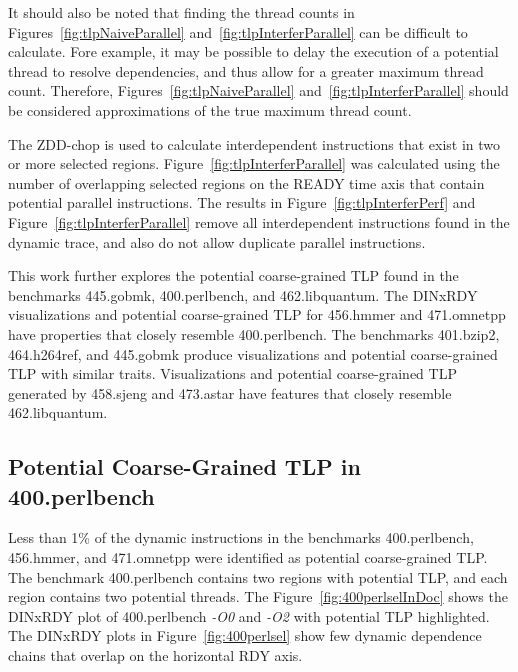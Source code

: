 {It should also be noted that finding the thread counts in Figures~\ref{fig:tlpNaiveParallel} and~\ref{fig:tlpInterferParallel} can be difficult to calculate.  Fore example, it may be possible to delay the execution of a potential thread to resolve dependencies, and thus allow for a greater maximum thread count.  Therefore, Figures~\ref{fig:tlpNaiveParallel} and~\ref{fig:tlpInterferParallel} should be considered approximations of the true maximum thread count.

The ZDD-chop is used to calculate interdependent instructions that exist in two or more selected regions. Figure~\ref{fig:tlpInterferParallel} was calculated using the number of overlapping selected regions on the READY time axis that contain potential parallel instructions. The results in Figure~\ref{fig:tlpInterferPerf} and Figure~\ref{fig:tlpInterferParallel} remove all interdependent instructions found in the dynamic trace, and also do not allow duplicate parallel instructions.

This work further explores the potential coarse-grained TLP found in the benchmarks 445.gobmk, 400.perlbench, and 462.libquantum.  The DINxRDY visualizations and potential coarse-grained TLP for 456.hmmer and 471.omnetpp have properties that closely resemble 400.perlbench. The benchmarks 401.bzip2, 464.h264ref, and 445.gobmk produce visualizations and potential coarse-grained TLP with similar traits. Visualizations and potential coarse-grained TLP generated by 458.sjeng and 473.astar have features that closely resemble 462.libquantum.

\subsection{Potential Coarse-Grained TLP in 400.perlbench}

Less than 1\% of the dynamic instructions in the benchmarks 400.perlbench, 456.hmmer, and 471.omnetpp were identified as potential coarse-grained TLP.  The benchmark 400.perlbench contains two regions with potential TLP, and each region contains two potential threads. The Figure~\ref{fig:400perlselInDoc} shows the DINxRDY plot of 400.perlbench \textit{-O0} and \textit{-O2} with potential TLP highlighted.  The DINxRDY plots in Figure~\ref{fig:400perlsel} show few dynamic dependence chains that overlap on the horizontal RDY axis.

}
